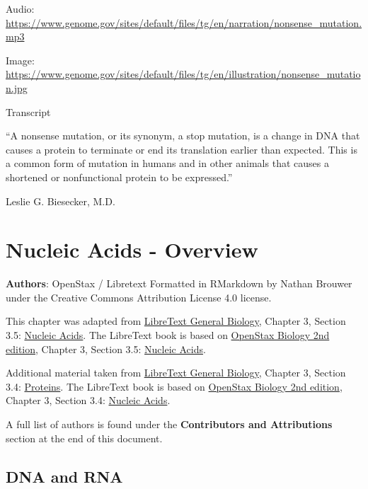 \documentclass[
]{book}
\begin{document}
Audio: \url{https://www.genome.gov/sites/default/files/tg/en/narration/nonsense_mutation.mp3}

Image: \url{https://www.genome.gov/sites/default/files/tg/en/illustration/nonsense_mutation.jpg}

Transcript

``A nonsense mutation, or its synonym, a stop mutation, is a change in DNA that causes a protein to terminate or end its translation earlier than expected. This is a common form of mutation in humans and in other animals that causes a shortened or nonfunctional protein to be expressed.''

Leslie G. Biesecker, M.D.

\hypertarget{nucleic-acids-review}{%
\section{Nucleic Acids - Overview}\label{nucleic-acids-review}}

\textbf{Authors}: OpenStax / Libretext Formatted in RMarkdown by Nathan
Brouwer under the Creative Commons Attribution License 4.0 license.

This chapter was adapted from \href{https://bio.libretexts.org/Bookshelves/Introductory_and_General_Biology/Book\%3A_General_Biology_(OpenStax)}{LibreText General
Biology},
Chapter 3, Section 3.5: \href{https://bio.libretexts.org/Bookshelves/Introductory_and_General_Biology/Book\%3A_General_Biology_(OpenStax)/1\%3A_The_Chemistry_of_Life/3\%3A_Biological_Macromolecules/3.5\%3A_Nucleic_Acids}{Nucleic
Acids}.
The LibreText book is based on \href{https://openstax.org/details/books/biology-2e}{OpenStax Biology 2nd
edition}, Chapter 3,
Section 3.5: \href{https://openstax.org/books/biology-2e/pages/3-5-nucleic-acids}{Nucleic
Acids}.

Additional material taken from \href{}{LibreText General Biology}, Chapter 3,
Section 3.4:
\href{https://bio.libretexts.org/Bookshelves/Introductory_and_General_Biology/Book\%3A_General_Biology_(OpenStax)/1\%3A_The_Chemistry_of_Life/3\%3A_Biological_Macromolecules/3.4\%3A_Proteins}{Proteins}.
The LibreText book is based on \href{https://openstax.org/details/books/biology-2e}{OpenStax Biology 2nd
edition}, Chapter 3,
Section 3.4: \href{https://openstax.org/books/biology-2e/pages/3-4-proteins}{Nucleic
Acids}.

A full list of authors is found under the \textbf{Contributors and
Attributions} section at the end of this document.

\hypertarget{dna-and-rna}{%
\subsection{DNA and RNA}\label{dna-and-rna}}
\end{document}
